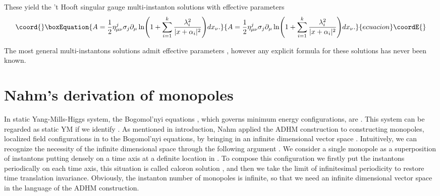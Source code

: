 \documentclass[a4paper,10pt]{article}
\begin{document}
These yield the 't Hooft singular gauge multi-instanton solutions with \coordHE{}  effective parameters \cite{AHDM}
\begin{equation}\coord{}\boxEquation{
A=\frac{1}{2}{\eta}^j_{\mu\nu}\sigma_j\partial_\mu \ln \Biggl(1+\sum^k_{i=1}\frac{\lambda^2_i}{|x+\alpha_i|^2}\Biggr)dx_\nu. 
}{
A=\frac{1}{2}{\eta}^j_{\mu\nu}\sigma_j\partial_\mu \ln \Biggl(1+\sum^k_{i=1}\frac{\lambda^2_i}{|x+\alpha_i|^2}\Biggr)dx_\nu. 
}{ecuacion}\coordE{}\end{equation}


The most general multi-instantons solutions admit \coordHE{}  effective parameters \cite{AHDM,DM}, however any explicit formula for these solutions has never been known.

\section{Nahm's derivation of monopoles}
In static Yang-Mills-Higgs system, the Bogomol'nyi equations \cite{Bogo}, which governs minimum energy configurations, are \coordHE{}.
This system can be regarded as static YM if we identify \coordHE{}.
As mentioned in introduction, Nahm \cite{Nahm82} applied the ADHM construction to constructing monopoles, localized field configurations in \coordHE{} to the Bogomol'nyi equations, by bringing in an infinite dimensional vector space \coordHE{}.
Intuitively, we can recognize the necessity of the infinite dimensional \coordHE{} space through the following argument \cite{Rossi}.
We consider a single monopole as a superposition of instantons putting densely on a time axis at a definite location in \coordHE{}.
To compose this configuration we firstly put the instantons periodically on each time axis, this situation is called caloron solution \cite{KvB,HS}, and then we take the limit of infinitesimal periodicity to restore time translation invariance.
Obviously, the instanton number of monopoles is infinite, so that we need an infinite dimensional vector space in the language of the ADHM construction.
\end{document}
